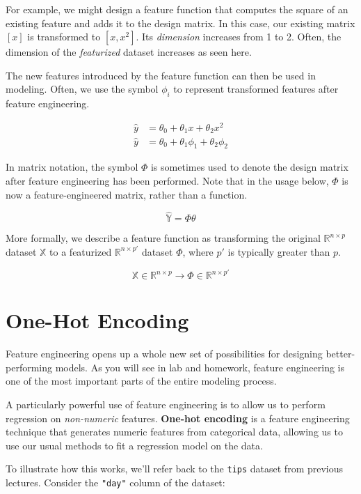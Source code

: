 \documentclass[
  letterpaper,
  DIV=11,
  numbers=noendperiod]{scrreprt}
\begin{document}
For example, we might design a feature function that computes the square
of an existing feature and adds it to the design matrix. In this case,
our existing matrix \([x]\) is transformed to \([x, x^2]\). Its
\emph{dimension} increases from 1 to 2. Often, the dimension of the
\emph{featurized} dataset increases as seen here.

The new features introduced by the feature function can then be used in
modeling. Often, we use the symbol \(\phi_i\) to represent transformed
features after feature engineering.

\[
\begin{align}
\hat{y} &= \theta_0 + \theta_1 x + \theta_2 x^2 \\
\hat{y} &= \theta_0 + \theta_1 \phi_1 + \theta_2 \phi_2
\end{align}
\]

In matrix notation, the symbol \(\Phi\) is sometimes used to denote the
design matrix after feature engineering has been performed. Note that in
the usage below, \(\Phi\) is now a feature-engineered matrix, rather
than a function.

\[\hat{\mathbb{Y}} = \Phi \theta\]

More formally, we describe a feature function as transforming the
original \(\mathbb{R}^{n \times p}\) dataset \(\mathbb{X}\) to a
featurized \(\mathbb{R}^{n \times p'}\) dataset \(\mathbb{\Phi}\), where
\(p'\) is typically greater than \(p\).

\[\mathbb{X} \in \mathbb{R}^{n \times p} \longrightarrow \Phi \in \mathbb{R}^{n \times p'}\]

\section{One-Hot Encoding}\label{one-hot-encoding}

Feature engineering opens up a whole new set of possibilities for
designing better-performing models. As you will see in lab and homework,
feature engineering is one of the most important parts of the entire
modeling process.

A particularly powerful use of feature engineering is to allow us to
perform regression on \emph{non-numeric} features. \textbf{One-hot
encoding} is a feature engineering technique that generates numeric
features from categorical data, allowing us to use our usual methods to
fit a regression model on the data.

To illustrate how this works, we'll refer back to the \texttt{tips}
dataset from previous lectures. Consider the \texttt{"day"} column of
the dataset:
\end{document}
